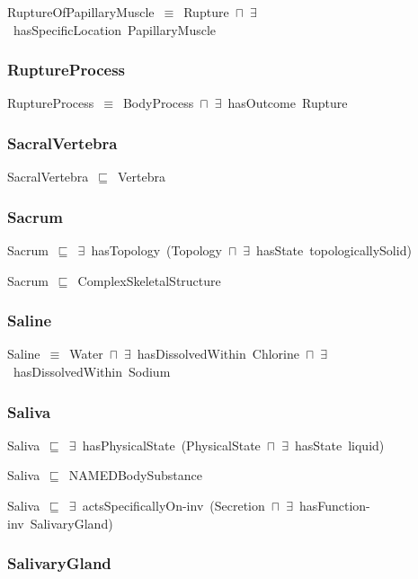 \documentclass{article}
\begin{document}
RuptureOfPapillaryMuscle~\ensuremath{\equiv}~Rupture~\ensuremath{\sqcap}~\ensuremath{\exists}~hasSpecificLocation~PapillaryMuscle

\subsubsection*{RuptureProcess}

RuptureProcess~\ensuremath{\equiv}~BodyProcess~\ensuremath{\sqcap}~\ensuremath{\exists}~hasOutcome~Rupture

\subsubsection*{SacralVertebra}

SacralVertebra~\ensuremath{\sqsubseteq}~Vertebra~

\subsubsection*{Sacrum}

Sacrum~\ensuremath{\sqsubseteq}~\ensuremath{\exists}~hasTopology~(Topology~\ensuremath{\sqcap}~\ensuremath{\exists}~hasState~topologicallySolid)~

Sacrum~\ensuremath{\sqsubseteq}~ComplexSkeletalStructure~

\subsubsection*{Saline}

Saline~\ensuremath{\equiv}~Water~\ensuremath{\sqcap}~\ensuremath{\exists}~hasDissolvedWithin~Chlorine~\ensuremath{\sqcap}~\ensuremath{\exists}~hasDissolvedWithin~Sodium

\subsubsection*{Saliva}

Saliva~\ensuremath{\sqsubseteq}~\ensuremath{\exists}~hasPhysicalState~(PhysicalState~\ensuremath{\sqcap}~\ensuremath{\exists}~hasState~liquid)~

Saliva~\ensuremath{\sqsubseteq}~NAMEDBodySubstance~

Saliva~\ensuremath{\sqsubseteq}~\ensuremath{\exists}~actsSpecificallyOn-inv~(Secretion~\ensuremath{\sqcap}~\ensuremath{\exists}~hasFunction-inv~SalivaryGland)~

\subsubsection*{SalivaryGland}
\end{document}
